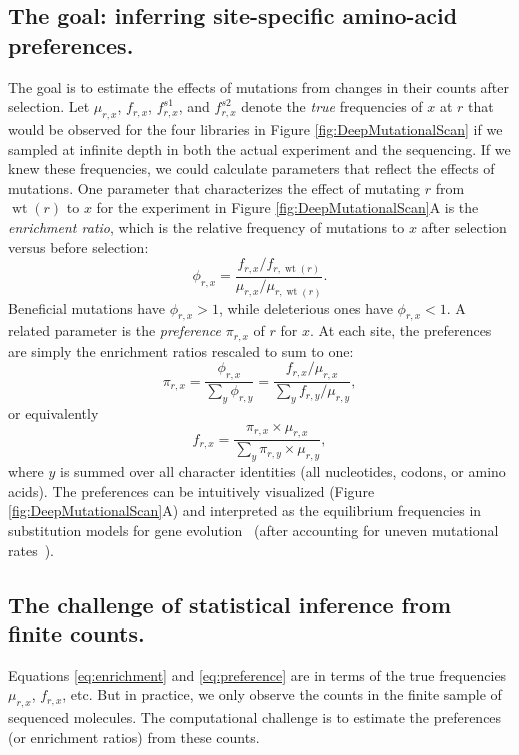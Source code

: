 \documentclass[twocolumn]{bmcart}%
\begin{document}
\subsection*{The goal: inferring site-specific amino-acid preferences.}
The goal is to estimate the effects of mutations from changes in their counts after selection. Let $\mu_{r,x}$, $f_{r,x}$, $f_{r,x}^{s1}$, and $f_{r,x}^{s2}$ denote the \emph{true} frequencies of $x$ at $r$ that would be observed for the four libraries in Figure \ref{fig:DeepMutationalScan} if we sampled at infinite depth in both the actual experiment and the sequencing. If we knew these frequencies, we could calculate parameters that reflect the effects of mutations. One parameter that characterizes the effect of mutating $r$ from $\operatorname{wt}\left(r\right)$ to $x$ for the experiment in Figure \ref{fig:DeepMutationalScan}A is the \emph{enrichment ratio}, which is the relative frequency of mutations to $x$ after selection versus before selection:
\begin{equation}
\label{eq:enrichment}
\phi_{r,x} = \frac{f_{r,x} / f_{r,\operatorname{wt}\left(r\right)}}{\mu_{r,x} / \mu_{r,\operatorname{wt}\left(r\right)}}.
\end{equation}
Beneficial mutations have $\phi_{r,x} > 1$, while deleterious ones have $\phi_{r,x} < 1$. A related parameter is the \emph{preference} $\pi_{r,x}$ of $r$ for $x$. At each site, the preferences are simply the enrichment ratios rescaled to sum to one:
\begin{equation}
\label{eq:preference}
\pi_{r,x} = \frac{\phi_{r,x}}{\sum_y \phi_{r,y}} = \frac{f_{r,x} / \mu_{r,x}}{\sum_y f_{r,y} / \mu_{r,y}},
\end{equation}
or equivalently
\begin{equation}
\label{eq:preference2}
f_{r,x} = \frac{\pi_{r,x} \times \mu_{r,x}}{\sum_y \pi_{r,y} \times \mu_{r,y}},
\end{equation}
where $y$ is summed over all character identities (all nucleotides, codons, or amino acids).
The preferences can be intuitively visualized (Figure \ref{fig:DeepMutationalScan}A) and interpreted as the equilibrium frequencies in substitution models for gene evolution~\cite{bloom2014experimentally,bloom2014informed} (after accounting for uneven mutational rates~\cite{yampolsky2005exchangeability,stoltzfus2009climbing}). 

\subsection*{The challenge of statistical inference from finite counts.}
Equations \ref{eq:enrichment} and \ref{eq:preference} are in terms of the true frequencies $\mu_{r,x}$, $f_{r,x}$, etc. But in practice, we only observe the counts in the finite sample of sequenced molecules. The computational challenge is to estimate the preferences (or enrichment ratios) from these counts.
\end{document}
